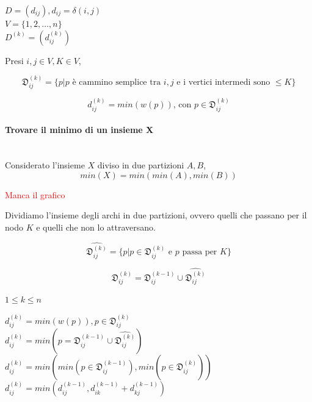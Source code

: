 \documentclass[11pt,a4paper,twoside,openright]{book}
\newcommand\myworries[1]{\textcolor{red}{#1}}
\let\oldparagraph\paragraph
\renewcommand{\paragraph}[1]{\oldparagraph{#1}\mbox{}}
\begin{document}
{{$D=(d_{ij}), d_{ij} = \delta(i,j)$ \\ 
$V=\{1,2,\ldots,n\}$ \\ 
$D^{(k)} = (d_{ij}^{(k)})$ 


Presi $i,j \in V, K \in V$, 

\begin{equation}
\mathfrak{D}_{ij}^{(k)} = \{p | p \mbox{ è cammino semplice tra } i,j \mbox{ e i vertici intermedi sono }\leq K \}
\end{equation}

\begin{equation}
d_{ij}^{(k)} = min(w(p))\mbox{, con }p \in \mathfrak{D}_{ij}^{(k)}
\end{equation}

\begin{framed}
\paragraph{Trovare il minimo di un insieme X} \\
Considerato l'insieme $X$ diviso in due partizioni $A,B$,
\begin{equation}
min(X) = min(min(A),min(B))
\end{equation}
\end{framed}

\myworries{Manca il grafico}

Dividiamo l'insieme degli archi in due partizioni, ovvero quelli che passano per il nodo $K$ e quelli che non lo attraversano.

\begin{equation}
\hat{\mathfrak{D}_{ij}^{(k)}} = \{p | p \in \mathfrak{D}_{ij}^{(k)} \mbox{ e } p \mbox{ passa per } K \}
\end{equation}

\begin{equation}
\mathfrak{D}_{ij}^{(k)} = \mathfrak{D}_{ij}^{(k-1)} \cup \hat{\mathfrak{D}_{ij}^{(k)}} 
\end{equation}

$1 \leq k \leq n$

$d_{ij}^{(k)} = min(w(p)), p \in \mathfrak{D}_{ij}^{(k)}$ \\ 
$d_{ij}^{(k)} = min(p=\mathfrak{D}_{ij}^{(k-1)} \cup \hat{\mathfrak{D}_{ij}^{(k)}} )$ \\ 
$d_{ij}^{(k)} = min(min(p \in \mathfrak{D}_{ij}^{(k-1)}), min(p \in \hat{\mathfrak{D}_{ij}^{(k)}} ))$ \\ 


$d_{ij}^{(k)} = min(d_{ij}^{(k-1)}, d_{ik}^{(k-1)} + d_{kj}^{(k-1)} )$ \\ 



}}
\end{document}
